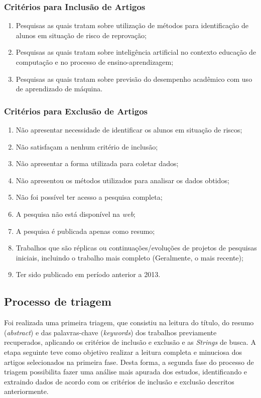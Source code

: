 \documentclass[
	12pt,				%
	openright,			%
	oneside,
	a4paper,			%
	english,			%
	french,				%
	spanish,			%
	brazil,				%
	]{abntex2}
\begin{document}
\subsubsection{Critérios para Inclusão de Artigos}

\begin{enumerate}
    \item Pesquisas as quais tratam sobre utilização de métodos para identificação de alunos em situação de risco de reprovação;
    \item Pesquisas as quais tratam sobre inteligência artificial no contexto educação de computação e no processo de ensino-aprendizagem;
    \item Pesquisas as quais tratam sobre previsão do desempenho acadêmico com uso de aprendizado de máquina.
\end{enumerate}

\subsubsection{Critérios para Exclusão de Artigos}
\begin{enumerate}
    \item Não apresentar necessidade de identificar os alunos em situação de riscos;
    \item Não satisfaçam a nenhum critério de inclusão;
    \item Não apresentar a forma utilizada para coletar dados;
    \item Não apresentou os métodos utilizados para analisar os dados obtidos;
    \item Não foi possível ter acesso a pesquisa completa;
    \item A pesquisa não está disponível na \textit{web};
    \item A pesquisa é publicada apenas como resumo;
    \item Trabalhos que são réplicas ou continuações/evoluções de projetos de pesquisas iniciais, incluindo o trabalho mais completo (Geralmente, o mais recente);
    \item Ter sido publicado em período anterior a 2013.
\end{enumerate}

\subsection{Processo de triagem}
Foi realizada uma primeira triagem, que consistiu na leitura do título, do resumo (\textit{abstract}) e das palavras-chave (\textit{keywords}) dos trabalhos previamente recuperados, aplicando os critérios de inclusão e exclusão e as \textit{Strings} de busca.
A etapa seguinte teve como objetivo realizar a leitura completa e minuciosa dos artigos selecionados na primeira fase. Desta forma, a segunda fase do processo de triagem possibilita fazer uma análise mais apurada dos estudos, identificando e extraindo dados de acordo com os critérios de inclusão e exclusão descritos anteriormente.
\end{document}
